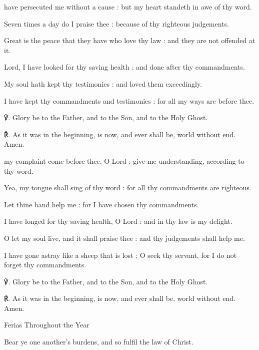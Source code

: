 \begin{multicols}{2}
 have persecuted me without a cause : but my heart standeth in awe of thy word.\par
{}
Seven times a day do I praise thee : because of thy righteous judgements.\par
{}Great is the peace that they have who love thy law : and they are not offended at it.\par
{}Lord, I have looked for thy saving health : and done after thy commandments.\par
{}My soul hath kept thy testimonies : and loved them exceedingly.\par
{}I have kept thy commandments and testimonies : for all my ways are before thee.\par
℣. Glory be to the Father, and to the Son, and to the Holy Ghost.\par
℟. As it was in the beginning, is now, and ever shall be, world without end. Amen.

 my complaint come before thee, O Lord : give me understanding, according to thy word.\par
{}
Yea, my tongue shall sing of thy word : for all thy commandments are righteous.\par
{}Let thine hand help me : for I have chosen thy commandments.\par
{}I have longed for thy saving health, O Lord : and in thy law is my delight.\par
{}O let my soul live, and it shall praise thee : and thy judgements shall help me.\par
{}I have gone astray like a sheep that is lost : O seek thy servant, for I do not forget thy commandments.\par
℣. Glory be to the Father, and to the Son, and to the Holy Ghost.\par
℟. As it was in the beginning, is now, and ever shall be, world without end. Amen.

\begin{inhead}
	Ferias Throughout the Year
\end{inhead}\par\noindent
Bear ye one another's burdens, and so fulfil the law of Christ.


\end{multicols}
